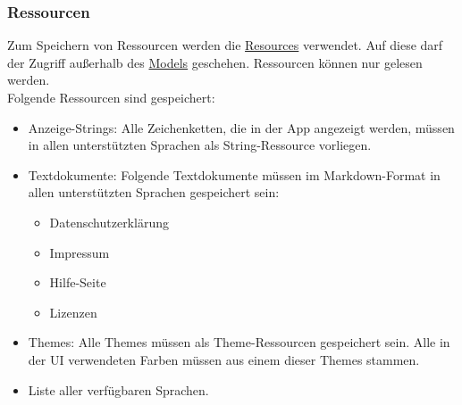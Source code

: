 \subsubsection{Ressourcen}\label{App_DataManagement_Ressourcen}
Zum Speichern von Ressourcen werden die \href{https://developer.android.com/reference/android/content/res/Resources}
{Resources} verwendet. Auf diese darf der Zugriff außerhalb des \hyperref[App_Model]{Models} geschehen. Ressourcen können nur gelesen werden.\\
Folgende Ressourcen sind gespeichert:
\begin{itemize}
    \item Anzeige-Strings: Alle Zeichenketten, die in der App angezeigt werden, 
    müssen in allen unterstützten Sprachen als String-Ressource vorliegen.
    \item Textdokumente: Folgende Textdokumente müssen im Markdown-Format in allen unterstützten 
    Sprachen gespeichert sein:
    \begin{itemize}
        \item Datenschutzerklärung
        \item Impressum
        \item Hilfe-Seite
        \item Lizenzen
    \end{itemize}
    \item Themes: Alle Themes müssen als Theme-Ressourcen gespeichert sein. 
    Alle in der UI verwendeten Farben müssen aus einem dieser Themes stammen.
    \item Liste aller verfügbaren Sprachen.
\end{itemize}